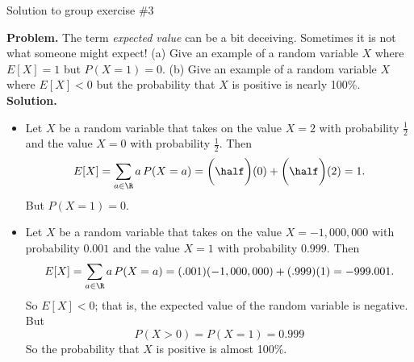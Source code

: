 \documentclass[10pt]{beamer}
\begin{document}
\begin{frame}{Solution to group exercise \#3}
\footnotesize

\textbf{Problem.} The term \textit{expected value} can be a bit deceiving. Sometimes it is not what someone might expect! (a) Give an example of a random variable $X$ where $E[X]=1$ but $P(X=1)=0$.  (b) Give an example of a random variable $X$ where $E[X]<0$ but the probability that $X$ is positive is nearly 100\%.
\vfill 
\textbf{Solution.}
\begin{itemize}
\item[a.] Let $X$ be a random variable that takes on the value $X=2$ with probability $\frac{1}{2}$ and the value $X=0$ with probability $\frac{1}{2}$. Then
\[ E[X] = \sum_{a \in \R} a \, P(X=a) = \bigg(\half \bigg)(0) + \bigg(\half \bigg)(2) = 1. \]
But $P(X=1)=0$.
\item[b.] Let $X$ be a random variable that takes on the value $X= -1,000,000$ with probability $0.001$ and the value $X=1$ with probability $0.999$.
Then 
\[ E[X] = \sum_{a \in \R} a \, P(X=a) = (.001)(-1,000,000) + (.999)(1) = -999.001. \]
So $E[X]<0$; that is, the expected value  of the random variable is negative. But 
\[P(X>0)=P(X=1)= 0.999\]
So the probability that $X$ is positive is almost 100\%.
\end{itemize}
	
\end{frame}
\end{document}
